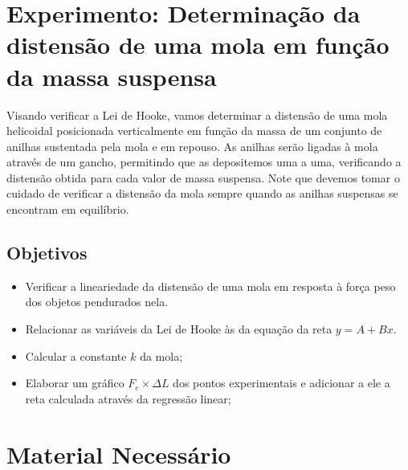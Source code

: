 
\section{Experimento: Determinação da distensão de uma mola em função da massa suspensa}

Visando verificar a Lei de Hooke, vamos determinar a distensão de uma mola helicoidal posicionada verticalmente em função da massa de um conjunto de anilhas sustentada pela mola e em repouso. As anilhas serão ligadas à mola através de um gancho, permitindo que as depositemos uma a uma, verificando a distensão obtida para cada valor de massa suspensa. Note que devemos tomar o cuidado de verificar a distensão da mola sempre quando as anilhas suspensas se encontram em equilíbrio.

\subsection{Objetivos}

\begin{itemize}
     \item Verificar a lineariedade da distensão de uma mola em resposta à força peso dos objetos pendurados nela.
	 \item Relacionar as variáveis da Lei de Hooke às da equação da reta $y = A + Bx$.
     \item Calcular a constante $k$ da mola;
     \item Elaborar um gráfico $F_e \times \Delta L$ dos pontos experimentais e adicionar a ele a reta calculada através da regressão linear;
\end{itemize}

\section{Material Necessário}

